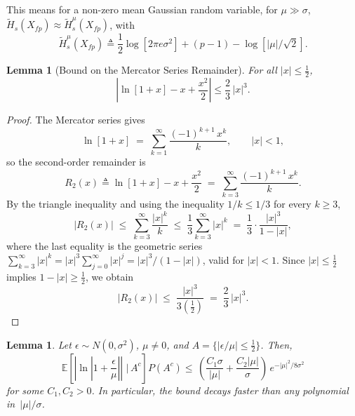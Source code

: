 \documentclass[12pt,onecolumn, margin=1in]{IEEEtran}
\newtheorem{lemma}[theorem]{Lemma}
\newcommand{\bracket}[1]{\left[ #1 \right]}
\newcommand{\paren}[1]{\left( #1 \right)}
\newcommand{\abs}[1]{\left| #1 \right|}
\newcommand{\E}[1]{\mathbb{E}\left[ #1 \right]}
\newcommand{\Ht}{\tilde{H}}
\newcommand{\Xfp}{X_{fp}}
\begin{document}
\noindent This means for a non-zero mean Gaussian random variable, for $\mu \gg \sigma$, $\Ht_s(\Xfp) \approx \Ht_s^\mu(X_{fp})$, with
\begin{equation}
    \label{eq:int_entropy}
    \Ht^\mu_s(\Xfp) \triangleq \frac{1}{2}\log[2\pi e \sigma^2] + (p-1) - \log\bracket{|\mu| / \sqrt{2}}.
\end{equation}


\begin{lemma}[Bound on the Mercator Series Remainder]\label{lem:mercator-remainder}
For all $|x| \le \frac{1}{2}$,
\begin{equation}
  \abs{\ln[1+x] - x + \frac{x^2}{2}} \leq \frac{2}{3}\,|x|^3.
\end{equation}
\end{lemma}
 
\begin{proof}
The Mercator series gives
\begin{equation}
  \ln\bracket{1+x} \;=\; \sum_{k=1}^{\infty} \frac{(-1)^{k+1}\, x^k}{k},
  \qquad |x| < 1,
\end{equation}
so the second-order remainder is
\begin{equation}
  R_2(x)
  \triangleq \ln\bracket{1+x} - x + \frac{x^2}{2}
  \;=\; \sum_{k=3}^{\infty} \frac{(-1)^{k+1}\, x^k}{k}.
\end{equation}
By the triangle inequality and using the inequality $1/k \le 1/3$ for every $k \ge 3$,
\begin{equation}
  |R_2(x)|
  \;\le\; \sum_{k=3}^{\infty} \frac{|x|^k}{k}
  \;\le\; \frac{1}{3} \sum_{k=3}^{\infty} |x|^k
  \;=\; \frac{1}{3} \cdot \frac{|x|^3}{1 - |x|},
\end{equation}
where the last equality is the geometric series
$\sum_{k=3}^{\infty} |x|^k = |x|^3 \sum_{j=0}^{\infty} |x|^j = |x|^3/(1-|x|)$,
valid for $|x| < 1$.
Since $|x| \le \frac{1}{2}$ implies $1 - |x| \ge \frac{1}{2}$, we obtain
\begin{equation}
  |R_2(x)|
  \;\le\; \frac{|x|^3}{3 \paren{\frac{1}{2}}}
  \;=\; \frac{2}{3}\,|x|^3.
\end{equation}
\end{proof}

\begin{lemma}\label{lem:Ac-bound}
Let $\epsilon \sim N(0,\sigma^2)$, $\mu \neq 0$, and $A = \{|\epsilon/\mu| \le \frac{1}{2}\}$.
Then,
\begin{equation}
  \E{\abs{\ln\abs{1+\frac{\epsilon}{\mu}}}\,\, \Bigr|\,A^c}P(A^c)
  \leq \,\paren{\frac{C_1\sigma}{|\mu|} + \frac{C_2|\mu|}{\sigma}}\, e^{-|\mu|^2/8\sigma^2}
\end{equation}
for some $C_1, C_2 > 0$.
In particular, the bound decays faster than any polynomial in~$|\mu|/\sigma$.
\end{lemma}
\end{document}
